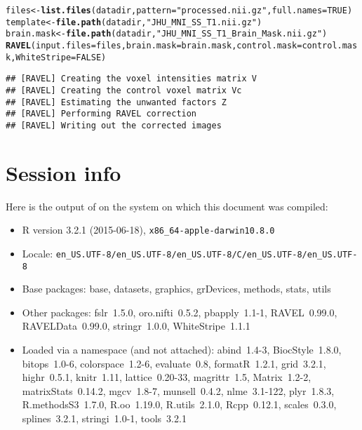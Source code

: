 \documentclass[12pt]{article}\usepackage[]{graphicx}\usepackage[]{color}
\makeatletter
\newcommand{\hlnum}[1]{\textcolor[rgb]{0.686,0.059,0.569}{#1}}%
\newcommand{\hlstr}[1]{\textcolor[rgb]{0.192,0.494,0.8}{#1}}%
\newcommand{\hlstd}[1]{\textcolor[rgb]{0.345,0.345,0.345}{#1}}%
\newcommand{\hlkwb}[1]{\textcolor[rgb]{0.69,0.353,0.396}{#1}}%
\newcommand{\hlkwc}[1]{\textcolor[rgb]{0.333,0.667,0.333}{#1}}%
\newcommand{\hlkwd}[1]{\textcolor[rgb]{0.737,0.353,0.396}{\textbf{#1}}}%
\newenvironment{kframe}{%
 \def\at@end@of@kframe{}%
 \ifinner\ifhmode%
  \def\at@end@of@kframe{\end{minipage}}%
  \begin{minipage}{\columnwidth}%
 \fi\fi%
 \def\FrameCommand##1{\hskip\@totalleftmargin \hskip-\fboxsep
 \colorbox{shadecolor}{##1}\hskip-\fboxsep
     \hskip-\linewidth \hskip-\@totalleftmargin \hskip\columnwidth}%
 \MakeFramed {\advance\hsize-\width
   \@totalleftmargin\z@ \linewidth\hsize
   \@setminipage}}%
 {\par\unskip\endMakeFramed%
 \at@end@of@kframe}
\newenvironment{knitrout}{}{} %
\makeatother
\begin{document}
\begin{knitrout}
\color{fgcolor}\begin{kframe}
\begin{alltt}
\hlstd{files} \hlkwb{<-} \hlkwd{list.files}\hlstd{(datadir,} \hlkwc{pattern}\hlstd{=}\hlstr{"processed.nii.gz"}\hlstd{,} \hlkwc{full.names}\hlstd{=}\hlnum{TRUE}\hlstd{)}
\hlstd{template}    \hlkwb{<-} \hlkwd{file.path}\hlstd{(datadir,} \hlstr{"JHU_MNI_SS_T1.nii.gz"}\hlstd{)}
\hlstd{brain.mask} \hlkwb{<-} \hlkwd{file.path}\hlstd{(datadir,} \hlstr{"JHU_MNI_SS_T1_Brain_Mask.nii.gz"}\hlstd{)}
\hlkwd{RAVEL}\hlstd{(}\hlkwc{input.files} \hlstd{= files,} \hlkwc{brain.mask} \hlstd{= brain.mask,} \hlkwc{control.mask} \hlstd{= control.mask,}\hlkwc{WhiteStripe}\hlstd{=}\hlnum{FALSE}\hlstd{)}
\end{alltt}
\begin{verbatim}
## [RAVEL] Creating the voxel intensities matrix V 
## [RAVEL] Creating the control voxel matrix Vc 
## [RAVEL] Estimating the unwanted factors Z 
## [RAVEL] Performing RAVEL correction 
## [RAVEL] Writing out the corrected images
\end{verbatim}
\end{kframe}
\end{knitrout}



\section*{Session info}

Here is the output of  on the system on which
this document was compiled:
\begin{itemize}\raggedright
  \item R version 3.2.1 (2015-06-18), \verb|x86_64-apple-darwin10.8.0|
  \item Locale: \verb|en_US.UTF-8/en_US.UTF-8/en_US.UTF-8/C/en_US.UTF-8/en_US.UTF-8|
  \item Base packages: base, datasets, graphics, grDevices, methods, stats,
    utils
  \item Other packages: fslr~1.5.0, oro.nifti~0.5.2, pbapply~1.1-1,
    RAVEL~0.99.0, RAVELData~0.99.0, stringr~1.0.0, WhiteStripe~1.1.1
  \item Loaded via a namespace (and not attached): abind~1.4-3, BiocStyle~1.8.0,
    bitops~1.0-6, colorspace~1.2-6, evaluate~0.8, formatR~1.2.1, grid~3.2.1,
    highr~0.5.1, knitr~1.11, lattice~0.20-33, magrittr~1.5, Matrix~1.2-2,
    matrixStats~0.14.2, mgcv~1.8-7, munsell~0.4.2, nlme~3.1-122, plyr~1.8.3,
    R.methodsS3~1.7.0, R.oo~1.19.0, R.utils~2.1.0, Rcpp~0.12.1, scales~0.3.0,
    splines~3.2.1, stringi~1.0-1, tools~3.2.1
\end{itemize}





\end{document}
